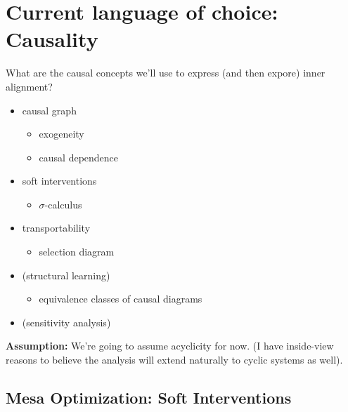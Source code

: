 \documentclass[letterpaper,10pt]{article}
\begin{document}
\section{Current language of choice: Causality}

What are the causal concepts we'll use to express (and then expore) inner alignment?

\begin{itemize}
  \item causal graph
  \begin{itemize}
    \item exogeneity
    \item causal dependence
  \end{itemize}
  \item soft interventions
  \begin{itemize}
    \item $\sigma$-calculus
  \end{itemize}
  \item transportability
  \begin{itemize}
    \item selection diagram
  \end{itemize}
  \item (structural learning)
  \begin{itemize}
    \item equivalence classes of causal diagrams
  \end{itemize}
  \item (sensitivity analysis)
\end{itemize}

\textbf{Assumption:} We're going to assume acyclicity for now. (I have inside-view reasons to believe the analysis will extend naturally to cyclic systems as well).

\subsection{Mesa Optimization: Soft Interventions}
\end{document}
